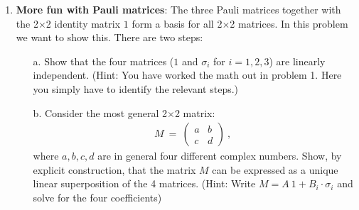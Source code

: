 \documentclass[12pt]{article}
\def \bea{\begin{eqnarray}}
\def \eea{\end{eqnarray}}
\def \bmat{\begin{matrix}}
\def \emat{\end{matrix}}
\def \({\left(}
\def \){\right)}
\def \bma{\(\bmat}
\def \ema{\emat\)}
\def \si{\sigma}
\def \1{1}%
\begin{document}
\begin{enumerate}
\item {\bf More fun with Pauli matrices}: The three Pauli matrices together with the
2$\times$2 identity matrix $\1$ form a basis for all 2$\times$2 matrices. In this
problem we want to show this. There are two steps:
\begin{enumerate}
  \item [a.] Show that the four matrices ($\1$ and $\si_i$ for $i = 1, 2, 3$) are linearly
  independent. (Hint: You have worked the math out in problem 1. Here you simply have to
  identify the relevant steps.)
  \item [b.] Consider the most general 2$\times$2 matrix:
   \bea
    M ~=~ \bma a & b \\ c & d \ema ~,~~
   \eea
  where $a, b, c, d$ are in general four different complex numbers. Show, by explicit
  construction, that the matrix $M$ can be expressed as a unique linear superposition
  of the 4 matrices.
  (Hint: Write $M = A~\1 + B_i\cdot\si_i$ and solve for the four coefficients)

\end{enumerate}


\end{enumerate}
\end{document}
